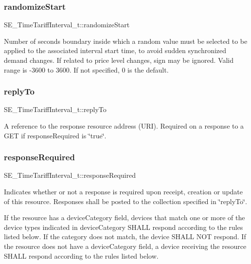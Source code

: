 \subsubsection{\texorpdfstring{randomize\+Start}{randomizeStart}}
{\footnotesize\ttfamily S\+E\+\_\+\+Time\+Tariff\+Interval\+\_\+t\+::randomize\+Start}

Number of seconds boundary inside which a random value must be selected to be applied to the associated interval start time, to avoid sudden synchronized demand changes. If related to price level changes, sign may be ignored. Valid range is -\/3600 to 3600. If not specified, 0 is the default. \mbox{\label{group__TimeTariffInterval_gadf4d995cb58644749ea7dd25109c6290}} 
\subsubsection{\texorpdfstring{reply\+To}{replyTo}}
{\footnotesize\ttfamily S\+E\+\_\+\+Time\+Tariff\+Interval\+\_\+t\+::reply\+To}

A reference to the response resource address (U\+RI). Required on a response to a G\+ET if response\+Required is \char`\"{}true\char`\"{}. \mbox{\label{group__TimeTariffInterval_ga6c820fb8d5ca8941778d1d1b72a8db5f}} 
\subsubsection{\texorpdfstring{response\+Required}{responseRequired}}
{\footnotesize\ttfamily S\+E\+\_\+\+Time\+Tariff\+Interval\+\_\+t\+::response\+Required}

Indicates whether or not a response is required upon receipt, creation or update of this resource. Responses shall be posted to the collection specified in \char`\"{}reply\+To\char`\"{}.

If the resource has a device\+Category field, devices that match one or more of the device types indicated in device\+Category S\+H\+A\+LL respond according to the rules listed below. If the category does not match, the device S\+H\+A\+LL N\+OT respond. If the resource does not have a device\+Category field, a device receiving the resource S\+H\+A\+LL respond according to the rules listed below.

